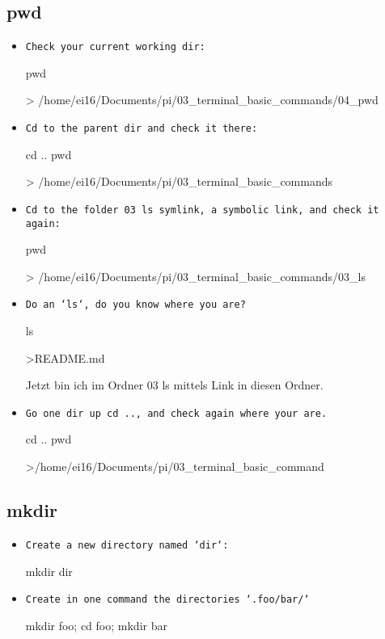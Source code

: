\documentclass[10pt,a4paper]{scrartcl}
\begin{document}
\subsection{pwd}
\begin{itemize}

\item \texttt{Check your current working dir:}
\begin{terminalcode}
pwd

> /home/ei16/Documents/pi/03_terminal_basic_commands/04_pwd

\end{terminalcode}


\item \texttt{Cd to the parent dir and check it there:}
\begin{terminalcode}
cd ..
pwd

> /home/ei16/Documents/pi/03_terminal_basic_commands 

\end{terminalcode}

\item \texttt{Cd to the folder 03 ls symlink, a symbolic link, and check it again:}

\begin{terminalcode}
pwd

> /home/ei16/Documents/pi/03_terminal_basic_commands/03_ls
\end{terminalcode}


\item \texttt{Do an `ls`, do you know where you are?}
\begin{terminalcode}
ls

>README.md
\end{terminalcode}
Jetzt bin ich im Ordner 03 ls mittels Link in diesen Ordner.


\item \texttt{Go one dir up cd .., and check again where your are.}
\begin{terminalcode}
cd ..
pwd

>/home/ei16/Documents/pi/03_terminal_basic_command
\end{terminalcode}

\end{itemize}

\subsection{mkdir}

\begin{itemize}

\item \texttt{Create a new directory named `dir`:}
\begin{terminalcode}
mkdir dir
\end{terminalcode}
\item \texttt{Create in one command the directories `.foo/bar/`}
\begin{terminalcode}
mkdir foo; cd foo; mkdir bar
\end{terminalcode}
\end{itemize}
\end{document}
